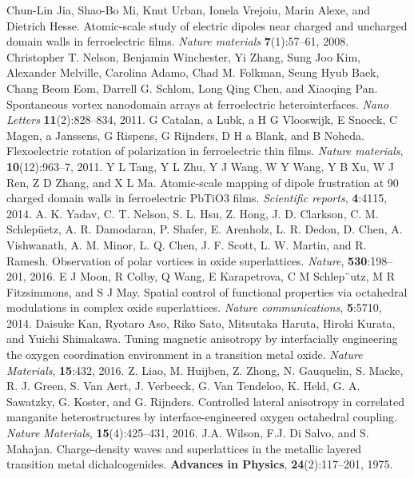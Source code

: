 \documentclass[12pt]{article}
\begin{document}
\begin{thebibliography}{99}
    Chun-Lin Jia, Shao-Bo Mi, Knut Urban, Ionela Vrejoiu, Marin Alexe, and Dietrich Hesse. Atomic-scale study of electric dipoles near charged and uncharged domain walls in ferroelectric films. \textit{Nature materials} \textbf{7}(1):57–61, 2008.
    Christopher T. Nelson, Benjamin Winchester, Yi Zhang, Sung Joo Kim, Alexander Melville, Carolina Adamo, Chad M. Folkman, Seung Hyub Baek, Chang Beom Eom, Darrell G. Schlom, Long Qing Chen, and Xiaoqing Pan. Spontaneous vortex nanodomain arrays at ferroelectric heterointerfaces. \textit{Nano Letters} \textbf{11}(2):828–834, 2011.
    G Catalan, a Lubk, a H G Vlooswijk, E Snoeck, C Magen, a Janssens, G Rispens, G Rijnders, D H a Blank, and B Noheda. Flexoelectric rotation of polarization in ferroelectric thin films. \textit{Nature materials}, \textbf{10}(12):963–7, 2011.
    Y L Tang, Y L Zhu, Y J Wang, W Y Wang, Y B Xu, W J Ren, Z D Zhang, and X L Ma. Atomic-scale mapping of dipole frustration at 90 charged domain walls in ferroelectric PbTiO3 films. \textit{Scientific reports}, \textbf{4}:4115, 2014.
    A. K. Yadav, C. T. Nelson, S. L. Hsu, Z. Hong, J. D. Clarkson, C. M. Schlep\"uetz, A. R. Damodaran, P. Shafer, E. Arenholz, L. R. Dedon, D. Chen, A. Vishwanath, A. M. Minor, L. Q. Chen, J. F. Scott, L. W. Martin, and R. Ramesh. Observation of polar vortices in oxide superlattices. \textit{Nature}, \textbf{530}:198–201, 2016.
    E J Moon, R Colby, Q Wang, E Karapetrova, C M Schlep¨utz, M R Fitzsimmons, and S J May. Spatial control of functional properties via octahedral modulations in complex oxide superlattices. \textit{Nature communications}, \textbf{5}:5710, 2014.
    Daisuke Kan, Ryotaro Aso, Riko Sato, Mitsutaka Haruta, Hiroki Kurata, and Yuichi Shimakawa. Tuning magnetic anisotropy by interfacially engineering the oxygen coordination environment in a transition metal oxide. \textit{Nature Materials}, \textbf{15}:432, 2016.
    Z. Liao, M. Huijben, Z. Zhong, N. Gauquelin, S. Macke, R. J. Green, S. Van Aert, J. Verbeeck, G. Van Tendeloo, K. Held, G. A. Sawatzky, G. Koster, and G. Rijnders. Controlled lateral anisotropy in correlated manganite heterostructures by interface-engineered oxygen octahedral coupling. \textit{Nature Materials}, \textbf{15}(4):425–431, 2016.
    J.A. Wilson, F.J. Di Salvo, and S. Mahajan. Charge-density waves and superlattices in the metallic layered transition metal dichalcogenides. \textbf{Advances in Physics}, \textbf{24}(2):117–201, 1975.

\end{thebibliography}
\end{document}
